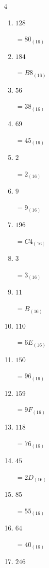 \begin{multicols}{4}
\begin{enumerate}
  \item $128$

        $=80_{(16)}$

  \item $184$

        $=B8_{(16)}$

  \item $56$

        $=38_{(16)}$

  \item $69$

        $=45_{(16)}$

\columnbreak %

  \item $2$

        $=2_{(16)}$

  \item $9$

        $=9_{(16)}$

  \item $196$

        $=C4_{(16)}$

  \item $3$

        $=3_{(16)}$

  \item $11$

        $=B_{(16)}$

  \item $110$

        $=6E_{(16)}$

  \item $150$

        $=96_{(16)}$

  \item $159$

        $=9F_{(16)}$

  \item $118$

        $=76_{(16)}$

  \item $45$

        $=2D_{(16)}$

  \item $85$

        $=55_{(16)}$

  \item $64$

        $=40_{(16)}$

  \item $246$


\end{enumerate}
\end{multicols}
